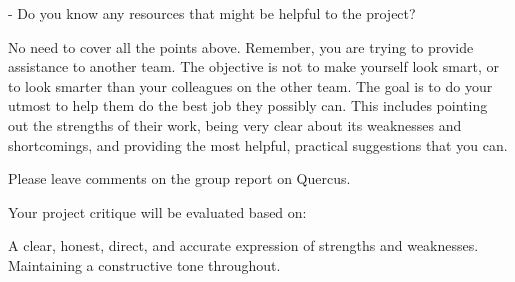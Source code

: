 \documentclass[12pt]{IEEEtran}
\begin{document}
- Do you know any resources that might be helpful to the project?

 

No need to cover all the points above. Remember, you are trying to provide assistance to another team. The objective is not to make yourself look smart, or to look smarter than your colleagues on the other team. The goal is to do your utmost to help them do the best job they possibly can. This includes pointing out the strengths of their work, being very clear about its weaknesses and shortcomings, and providing the most helpful, practical suggestions that you can.

 

Please leave comments on the group report on Quercus.

Your project critique will be evaluated based on:

A clear, honest, direct, and accurate expression of strengths and weaknesses.
Maintaining a constructive tone throughout.



\end{document}
